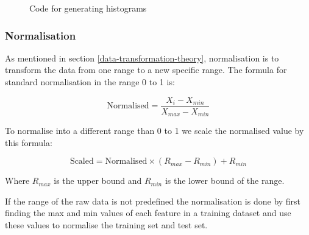 \documentclass[english, a4paper]{report}
\begin{document}
{{{{                \begin{figure}[H]
                    \centering {} \inputminted{python}{thesis/Code/histogramCode.py}
                    \caption{Code for generating histograms}
                    \label{fig:histogramCode}
                \end{figure}
                
            }
        
            \subsubsection{Normalisation}
            {
                As mentioned in section \ref{data-transformation-theory}, normalisation is to transform the data from one range to a new specific range. The formula for standard normalisation in the range 0 to 1 is:
                
                \begin{equation}
                    \label{normalisation-eq}
                    \text{Normalised} = \frac{X_i-X_{min}}{X_{max}-X_{min}}
                \end{equation}
                    
                To normalise into a different range than 0 to 1 we scale the normalised value by this formula:
                
                \begin{equation}
                    \label{scaling-eq}
                    \text{Scaled} = \text{Normalised} \times (R_{max}-R_{min}) + R_{min}
                \end{equation}
                    
                Where $R_{max}$ is the upper bound and $R_{min}$ is the lower bound of the range.
                \par
                If the range of the raw data is not predefined the normalisation is done by first finding the max and min values of each feature in a training dataset and use these values to normalise the training set and test set.
            }
            
}}}
\end{document}
